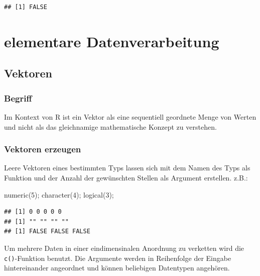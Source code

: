 \documentclass[
]{book}
\newenvironment{Shaded}{\begin{snugshade}}{\end{snugshade}}
\newcommand{\DecValTok}[1]{\textcolor[rgb]{0.00,0.00,0.81}{#1}}
\newcommand{\FunctionTok}[1]{\textcolor[rgb]{0.00,0.00,0.00}{#1}}
\newcommand{\NormalTok}[1]{#1}
\begin{document}
\begin{verbatim}
## [1] FALSE
\end{verbatim}

\hypertarget{elementare-datenverarbeitung}{%
\chapter{elementare Datenverarbeitung}\label{elementare-datenverarbeitung}}

\hypertarget{vektoren}{%
\section{Vektoren}\label{vektoren}}

\hypertarget{begriff}{%
\subsection{Begriff}\label{begriff}}

Im Kontext von R ist ein Vektor als eine sequentiell geordnete Menge von Werten und nicht als das gleichnamige mathematische Konzept zu verstehen.

\hypertarget{vektoren-erzeugen}{%
\subsection{Vektoren erzeugen}\label{vektoren-erzeugen}}

Leere Vektoren eines bestimmten Typs lassen sich mit dem Namen des Typs als Funktion und der Anzahl der gewünschten Stellen als Argument erstellen. z.B.:

\begin{Shaded}
\begin{Highlighting}[]
\FunctionTok{numeric}\NormalTok{(}\DecValTok{5}\NormalTok{);}
\FunctionTok{character}\NormalTok{(}\DecValTok{4}\NormalTok{);}
\FunctionTok{logical}\NormalTok{(}\DecValTok{3}\NormalTok{);}
\end{Highlighting}
\end{Shaded}

\begin{verbatim}
## [1] 0 0 0 0 0
## [1] "" "" "" ""
## [1] FALSE FALSE FALSE
\end{verbatim}

Um mehrere Daten in einer eindimensinalen Anordnung zu verketten wird die \texttt{c()}-Funktion benutzt.
Die Argumente werden in Reihenfolge der Eingabe hintereinander angeordnet und können beliebigen Datentypen angehören.
\end{document}
